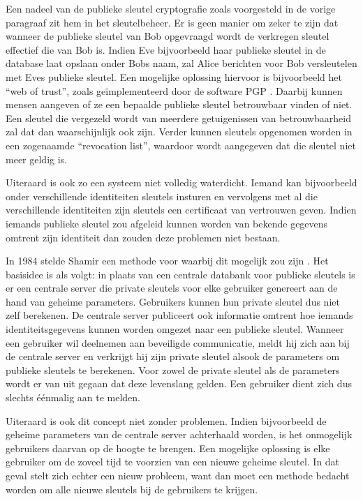 Een nadeel van de publieke sleutel cryptografie zoals voorgesteld in de vorige paragraaf zit hem in het sleutelbeheer. Er is geen manier om zeker te zijn dat wanneer de publieke sleutel van Bob opgevraagd wordt de verkregen sleutel effectief die van Bob is. Indien Eve bijvoorbeeld haar publieke sleutel in de database laat opslaan onder Bobs naam, zal Alice berichten voor Bob versleutelen met Eves publieke sleutel. Een mogelijke oplossing hiervoor is bijvoorbeeld het ``web of trust'', zoals ge\"implementeerd door de software PGP \cite{pgp}. Daarbij kunnen mensen aangeven of ze een bepaalde publieke sleutel betrouwbaar vinden of niet. Een sleutel die vergezeld wordt van meerdere getuigenissen van betrouwbaarheid zal dat dan waarschijnlijk ook zijn. Verder kunnen sleutels opgenomen worden in een zogenaamde ``revocation list'', waardoor wordt aangegeven dat die sleutel niet meer geldig is.

Uiteraard is ook zo een systeem niet volledig waterdicht. Iemand kan bijvoorbeeld onder verschillende identiteiten sleutels insturen en vervolgens met al die verschillende identiteiten zijn sleutels een certificaat van vertrouwen geven. Indien iemands publieke sleutel zou afgeleid kunnen worden van bekende gegevens omtrent zijn identiteit dan zouden deze problemen niet bestaan.

In 1984 stelde Shamir een methode voor waarbij dit mogelijk zou zijn \cite{shamir}. Het basisidee is als volgt: in plaats van een centrale databank voor publieke sleutels is er een centrale server die private sleutels voor elke gebruiker genereert aan de hand van geheime parameters. Gebruikers kunnen hun private sleutel dus niet zelf berekenen. De centrale server publiceert ook informatie omtrent hoe iemands identiteitsgegevens kunnen worden omgezet naar een publieke sleutel. Wanneer een gebruiker wil deelnemen aan beveiligde communicatie, meldt hij zich aan bij de centrale server en verkrijgt hij zijn private sleutel alsook de parameters om publieke sleutels te berekenen. Voor zowel de private sleutel als de parameters wordt er van uit gegaan dat deze levenslang gelden. Een gebruiker dient zich dus slechts \'e\'enmalig aan te melden.

Uiteraard is ook dit concept niet zonder problemen. Indien bijvoorbeeld de geheime parameters van de centrale server achterhaald worden, is het onmogelijk gebruikers daarvan op de hoogte te brengen. Een mogelijke oplossing is elke gebruiker om de zoveel tijd te voorzien van een nieuwe geheime sleutel. In dat geval stelt zich echter een nieuw probleem, want dan moet een methode bedacht worden om alle nieuwe sleutels bij de gebruikers te krijgen. 


